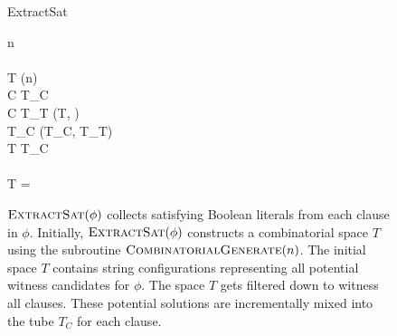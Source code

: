 
\begin{figure}[htbp]
\begin{center}

	\begin{pseudocode}{ExtractSat}{\phi}
	
	n  \phi \\
	\\
		T \GETS {}(n)\\
	
		\FOREACH {} C  \phi \DO
			\BEGIN
				T_C \GETS \emptyset \\
			
				\FOREACH {} \ell {} C \DO
					\BEGIN 
						T_T \GETS {}(T, \ell) \\
						T_C \GETS {}(T_C, T_T)
					\END \\
				T \GETS T_C \\
			\END \\
			
		\IF T = \emptyset
			\THEN {}\\
	\end{pseudocode}


\caption{$\text{\sc ExtractSat}(\phi)$ collects satisfying Boolean literals from each clause in $\phi$.  Initially, $\text{\sc ExtractSat}(\phi)$ constructs a combinatorial space $T$ using the subroutine $\text{\sc CombinatorialGenerate}(n)$.  The initial space $T$ contains string configurations representing all potential witness candidates for $\phi$.  The space $T$ gets filtered down to witness all clauses.  These potential solutions are incrementally mixed into the tube $T_C$ for each clause.  }
\label{extractSatAlgorithm}
\end{center}
\end{figure}
